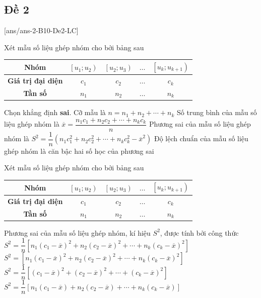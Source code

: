 \subsection{Đề 2}
[ans/ans-2-B10-De2-LC]
\caulc
\begin{ex}%
	Xét mẫu số liệu ghép nhóm cho bởi bảng sau
	\begin{center}
		\begin{tabular}{|c|c|c|c|c|}
			\hline
			\textbf{Nhóm} &$\left[u_1; u_2\right)$ &$\left[u_2; u_3\right)$ & $\ldots$ &$\left[u_k; u_{k+1}\right)$ \\
			\hline \textbf{Giá trị đại diện} & $c_1$ & $c_2$ & $\ldots$ & $c_k$ \\
			\hline \textbf{Tần số} & $n_1$ & $n_2$ & $\ldots$ & $n_k$ \\
			\hline
		\end{tabular}
	\end{center}
Chọn khẳng định \textbf{sai}.
\choice
{Cỡ mẫu là $ n=n_1+n_2+\cdots+n_k $}
{Số trung bình của mẫu số liệu ghép nhóm là $ \overline{x}=\dfrac{n_1c_1+n_2c_2+\cdots+n_kc_k}{n} $ }
{\True Phương sai của mẫu số liệu ghép nhóm là $ S^2=\dfrac{1}{n}\left( n_1c_1^2+n_2c_2^2+\cdots+n_kc_k^2-\overline{x}^2\right) $}
{Độ lệch chuẩn của mẫu số liệu ghép nhóm là căn bậc hai số học của phương sai}
\end{ex}
\begin{ex}%
	Xét mẫu số liệu ghép nhóm cho bởi bảng sau
\begin{center}
	\begin{tabular}{|c|c|c|c|c|}
		\hline
		\textbf{Nhóm} &$\left[u_1; u_2\right)$ &$\left[u_2; u_3\right)$ & $\ldots$ &$\left[u_k; u_{k+1}\right)$ \\
		\hline \textbf{Giá trị đại diện} & $c_1$ & $c_2$ & $\ldots$ & $c_k$ \\
		\hline \textbf{Tần số} & $n_1$ & $n_2$ & $\ldots$ & $n_k$ \\
		\hline
	\end{tabular}
\end{center}
Phương sai của mẫu số liệu ghép nhóm, kí hiệu $ S^2 $, được tính bởi công thức
\choice
{\True $ S^2=\dfrac{1}{n}\left[n_1(c_1-\overline{x})^2+n_2(c_2-\overline{x})^2+\cdots+n_k(c_k-\overline{x})^2 \right] $}
{$S^2=\left[n_1(c_1-\overline{x})^2+n_2(c_2-\overline{x})^2+\cdots+n_k(c_k-\overline{x})^2 \right] $}
{$ S^2=\dfrac{1}{n}\left[(c_1-\overline{x})^2+(c_2-\overline{x})^2+\cdots+(c_k-\overline{x})^2 \right] $}
{$ S^2=\dfrac{1}{n}\left[n_1(c_1-\overline{x})+n_2(c_2-\overline{x})+\cdots+n_k(c_k-\overline{x}) \right] $}
\end{ex}
